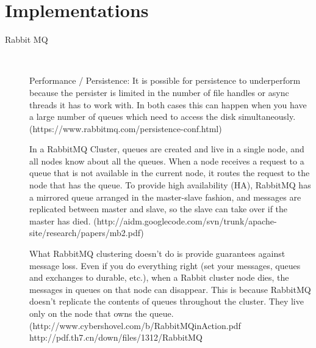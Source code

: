 \section{Implementations}

\begin{description}
    \item [Rabbit MQ] \hfill \\
    {
    Performance / Persistence:
    It is possible for persistence to underperform because the persister is
    limited in the number of file handles or async threads it has to work with.
    In both cases this can happen when you have a large number of queues which
    need to access the disk simultaneously. 
    (https://www.rabbitmq.com/persistence-conf.html)


    In a RabbitMQ Cluster, queues are
    created and live in a single node, and all nodes know about
    all the queues. When a node receives a request to a queue
    that is not available in the current node, it routes the request
    to the node that has the queue.
    To provide high availability
    (HA), RabbitMQ has a mirrored queue arranged in the
    master-slave fashion, and messages are replicated between
    master and slave, so the slave can take over if the master
    has died.
    (http://aidm.googlecode.com/svn/trunk/apache-site/research/papers/mb2.pdf)

    What RabbitMQ clustering doesn't do is provide guarantees against message loss.
    Even if you do everything right (set your messages, queues and exchanges to
    durable, etc.), when a Rabbit cluster node dies, the messages in queues on that
    node can disappear. This is because RabbitMQ doesn't replicate the contents
    of queues throughout the cluster. They live only on the node that owns the
    queue.
    (http://www.cybershovel.com/b/RabbitMQinAction.pdf
    http://pdf.th7.cn/down/files/1312/RabbitMQ%

}
\end{description}

